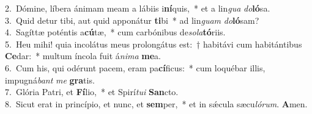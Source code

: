 {2.~}Dómine, líbera ánimam meam a lábiis i\textbf{ní}quis,~* et a lin\textit{gua} \textit{do}\textbf{ló}sa.\\
{3.~}Quid detur tibi, aut quid apponátur \textbf{ti}bi~* ad lin\textit{guam} \textit{do}\textbf{ló}sam?\\
{4.~}Sagíttæ poténtis a\textbf{cú}tæ,~* cum carbónibus de\textit{so}\textit{la}\textbf{tó}riis.\\
{5.~}Heu mihi! quia incolátus meus prolongátus est:~† habitávi cum habitántibus \textbf{Ce}dar:~* multum íncola fuit á\textit{ni}\textit{ma} \textbf{me}a.\\
{6.~}Cum his, qui odérunt pacem, eram pa\textbf{cí}ficus:~* cum loquébar illis, impugná\textit{bant} \textit{me} \textbf{gra}tis.\\
{7.~}Glória Patri, et \textbf{Fí}lio,~* et Spirí\textit{tu}\textit{i} \textbf{San}cto.\\
{8.~}Sicut erat in princípio, et nunc, et \textbf{sem}per,~* et in sǽcula sæcu\textit{ló}\textit{rum}. \textbf{A}men.\\
